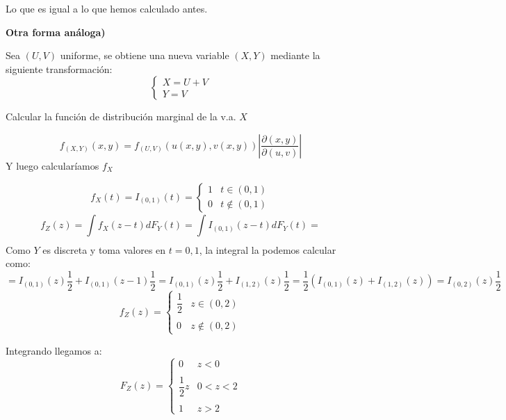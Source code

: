 \documentclass[openany]{book}
\begin{document}
\begin{exercise}
Lo que es igual a lo que hemos calculado antes.

\textbf{Otra forma análoga)}

Sea $ (U,V) $ uniforme, se obtiene una nueva variable $ (X,Y) $ mediante la siguiente transformación:
$$ \left\{
    \begin{array}{l}
        X = U+V\\
        Y = V
    \end{array}
    \right. $$
    
    Calcular la función de distribución marginal de la v.a. $ X $
    
    $$ f_{(X,Y)}(x,y) = f_{(U,V)} (u(x,y),v(x,y)) |\dfrac{\partial (x,y)}{\partial (u,v)}| $$
    Y luego calcularíamos $ f_{X} $

\end{exercise}


\begin{exercise}
    $$ f_{X}(t) = I_{(0,1)}(t) = \left\{
    \begin{array}{ll}
        1 & t \in (0,1)\\
        0 & t \not \in (0,1)
    \end{array}
    \right. $$
    $$ f_{Z}(z) = \int\limits_{}^{}f_{X}(z-t)dF_{Y}(t) = \int\limits_{}^{}I_{(0,1)}(z-t)dF_{Y}(t) =  $$
    Como $ Y $ es discreta y toma valores en $ t = 0,1 $, la integral la podemos calcular como:
    $$ = I_{(0,1)}(z) \dfrac{1}{2} + I_{(0,1)}(z-1)\dfrac{1}{2} = I_{(0,1)}(z) \dfrac{1}{2} + I_{(1,2)}(z)\dfrac{1}{2} = \dfrac{1}{2}(I_{(0,1)}(z) + I_{(1,2)}(z)) = I_{(0,2)}(z)\dfrac{1}{2}$$
    $$ f_{Z}(z) = \left\{
    \begin{array}{ll}
        \dfrac{1}{2} & z \in (0,2)\\\\
        0 & z \not \in (0,2)
    \end{array}
    \right. $$
    
    Integrando llegamos a:
    $$ F_{Z}(z) = \left\{
    \begin{array}{ll}
        0 & z < 0\\\\
        \dfrac{1}{2}z & 0<z<2\\\\
        1 & z > 2

    \end{array}
    \right. $$
\end{exercise}
\end{document}
